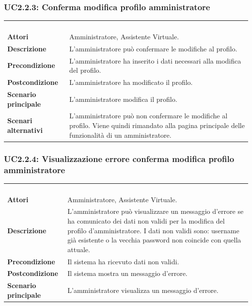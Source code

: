 \subsubsection{UC2.2.3: Conferma modifica profilo amministratore}
\label{UC2.2.3}
\begin{longtable}{l|p{10cm}}
\rowcolor[gray]{0.8} \multicolumn{2}{c}{} \\
\rowcolor[gray]{0.8} \multicolumn{2}{c}{\textbf{UC2.2.3 - Conferma modifica profilo amministratore}} \\
\rowcolor[gray]{0.8} \multicolumn{2}{c}{} \\
\hline
&\\
\textbf{Attori} & Amministratore, Assistente Virtuale.\\[7pt]
\textbf{Descrizione} & L'amministratore può confermare le modifiche al profilo.\\[7pt]
\textbf{Precondizione} & L'amministratore ha inserito i dati necessari alla modifica del profilo.\\[7pt]
\textbf{Postcondizione} & L'amministratore ha modificato il profilo.\\[7pt]
\textbf{Scenario principale} &L'amministratore modifica il profilo.\\[7pt]
\textbf{Scenari alternativi} & L'amministratore può non confermare le modifiche al profilo. Viene quindi rimandato alla pagina principale delle funzionalità di un amministratore.\\[7pt]\hline
\end{longtable}

\subsubsection{UC2.2.4: Visualizzazione errore conferma modifica profilo amministratore }
\label{UC2.2.4}
\begin{longtable}{l|p{10cm}}
\rowcolor[gray]{0.8} \multicolumn{2}{c}{} \\
\rowcolor[gray]{0.8} \multicolumn{2}{c}{\textbf{UC2.2.4 - Visualizzazione errore conferma modifica profilo amministratore }} \\
\rowcolor[gray]{0.8} \multicolumn{2}{c}{} \\
\hline
&\\
\textbf{Attori} & Amministratore, Assistente Virtuale.\\[7pt]
\textbf{Descrizione} & L'amministratore può visualizzare un messaggio d'errore se ha comunicato dei dati non validi per la modifica del profilo d'amministratore.
I dati non validi sono: username già esistente o la vecchia password non coincide con quella attuale.\\[7pt]
\textbf{Precondizione} & Il sistema ha ricevuto dati non validi.\\[7pt]
\textbf{Postcondizione} & Il sistema mostra un messaggio d'errore.\\[7pt]
\textbf{Scenario principale} &L'amministratore visualizza un messaggio d'errore.\\[7pt]\hline
\end{longtable}

